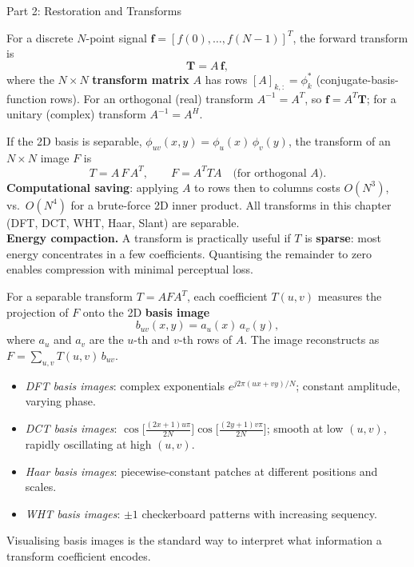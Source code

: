 \documentclass[letterpaper]{article}
\begin{document}
\begin{notes}{Part 2: Restoration and Transforms}


For a discrete $N$-point signal $\mathbf{f}=[f(0),\ldots,f(N-1)]^T$, the forward transform is
$$\mathbf{T} = A\,\mathbf{f},$$
where the $N\times N$ \textbf{transform matrix} $A$ has rows $[A]_{k,:} = \phi_k^*$ (conjugate-basis-function rows). For an orthogonal (real) transform $A^{-1}=A^T$, so $\mathbf{f} = A^T\mathbf{T}$; for a unitary (complex) transform $A^{-1}=A^H$.


If the 2D basis is separable, $\phi_{uv}(x,y)=\phi_u(x)\,\phi_v(y)$, the transform of an $N\times N$ image $F$ is
$$T = A\,F\,A^T, \qquad F = A^T T A \quad \text{(for orthogonal }A\text{)}.$$
\textbf{Computational saving}: applying $A$ to rows then to columns costs $O(N^3)$, vs.\ $O(N^4)$ for a brute-force 2D inner product. All transforms in this chapter (DFT, DCT, WHT, Haar, Slant) are separable.\\

\textbf{Energy compaction.} A transform is practically useful if $T$ is \textbf{sparse}: most energy concentrates in a few coefficients. Quantising the remainder to zero enables compression with minimal perceptual loss.


For a separable transform $T=AFA^T$, each coefficient $T(u,v)$ measures the projection of $F$ onto the 2D \textbf{basis image}
$$b_{uv}(x,y) = a_u(x)\,a_v(y),$$
where $a_u$ and $a_v$ are the $u$-th and $v$-th rows of $A$. The image reconstructs as $F = \sum_{u,v}T(u,v)\,b_{uv}$.

\begin{itemize}
    \item \emph{DFT basis images}: complex exponentials $e^{j2\pi(ux+vy)/N}$; constant amplitude, varying phase.
    \item \emph{DCT basis images}: $\cos\!\bigl[\frac{(2x+1)u\pi}{2N}\bigr]\cos\!\bigl[\frac{(2y+1)v\pi}{2N}\bigr]$; smooth at low $(u,v)$, rapidly oscillating at high $(u,v)$.
    \item \emph{Haar basis images}: piecewise-constant patches at different positions and scales.
    \item \emph{WHT basis images}: $\pm1$ checkerboard patterns with increasing sequency.
\end{itemize}
Visualising basis images is the standard way to interpret what information a transform coefficient encodes.


\end{notes}
\end{document}
